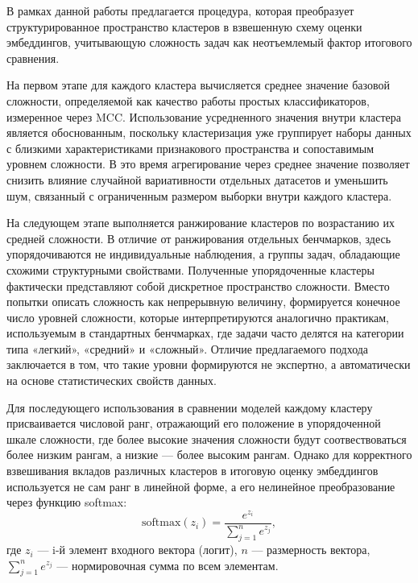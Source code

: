 \documentclass[specification,annotation,times]{itmo-student-thesis}
\begin{document}
В рамках данной работы предлагается процедура, которая преобразует структурированное пространство кластеров в взвешенную схему оценки эмбеддингов, учитывающую сложность задач как неотъемлемый фактор итогового сравнения.

На первом этапе для каждого кластера вычисляется среднее значение базовой сложности, определяемой как качество работы простых классификаторов, измеренное через MCC. Использование усредненного значения внутри кластера является обоснованным, поскольку кластеризация уже группирует наборы данных с близкими характеристиками признакового пространства и сопоставимым уровнем сложности. В это время агрегирование через среднее значение позволяет снизить влияние случайной вариативности отдельных датасетов и уменьшить шум, связанный с ограниченным размером выборки внутри каждого кластера.

На следующем этапе выполняется ранжирование кластеров по возрастанию их средней сложности. В отличие от ранжирования отдельных бенчмарков, здесь упорядочиваются не индивидуальные наблюдения, а группы задач, обладающие схожими структурными свойствами.
Полученные упорядоченные кластеры фактически представляют собой дискретное пространство сложности. Вместо попытки описать сложность как непрерывную величину, формируется конечное число уровней сложности, которые интерпретируются аналогично практикам, используемым в стандартных бенчмарках, где задачи часто делятся на категории типа «легкий», «средний» и «сложный». Отличие предлагаемого подхода заключается в том, что такие уровни формируются не экспертно, а автоматически на основе статистических свойств данных.

Для последующего использования в сравнении моделей каждому кластеру присваивается числовой ранг, отражающий его положение в упорядоченной шкале сложности, где более высокие значения сложности будут соотвествоваться более низким рангам, а низкие — более высоким рангам. Однако для корректного взвешивания вкладов различных кластеров в итоговую оценку эмбеддингов используется не сам ранг в линейной форме, а его нелинейное преобразование через функцию softmax:
\[
\text{softmax}(z_i) = \frac{e^{z_i}}{\sum_{j=1}^{n} e^{z_j}},
\]
где $z_i$ --- i-й элемент входного вектора (логит), 
$n$ --- размерность вектора,
$\sum_{j=1}^{n} e^{z_j}$ --- нормировочная сумма по всем элементам.
\end{document}
